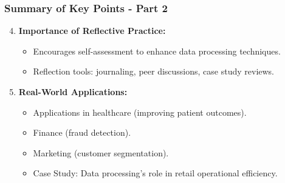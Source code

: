 \documentclass[aspectratio=169]{beamer}
\begin{document}
\begin{frame}[fragile]
    \frametitle{Summary of Key Points - Part 2}

    \begin{enumerate}
        \setcounter{enumi}{3}
        \item \textbf{Importance of Reflective Practice:}
        \begin{itemize}
            \item Encourages self-assessment to enhance data processing techniques.
            \item Reflection tools: journaling, peer discussions, case study reviews.
        \end{itemize}

        \item \textbf{Real-World Applications:}
        \begin{itemize}
            \item Applications in healthcare (improving patient outcomes).
            \item Finance (fraud detection).
            \item Marketing (customer segmentation).
            \item Case Study: Data processing's role in retail operational efficiency.
        \end{itemize}
    \end{enumerate}
\end{frame}
\end{document}
